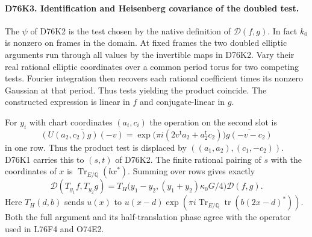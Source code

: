 \paragraph{D76K3. Identification and Heisenberg covariance of the doubled test.}
The $\psi$ of D76K2 is the test chosen by the native definition of
$\mathcal D(f,g)$. In fact $k_0$ is nonzero on frames in the domain.
At fixed frames the two doubled elliptic arguments run through
all values by the invertible maps in D76K2. Vary their real rational
elliptic coordinates over a common period torus for two competing
tests. Fourier integration then recovers each rational coefficient
times its nonzero Gaussian at that period. Thus tests yielding the
product coincide. The constructed expression is linear in $f$ and
conjugate-linear in $g$.

For $y_i$ with chart coordinates $(a_i,c_i)$ the operation on
the second slot is
\[
 \overline{(U(a_2,c_2)g)(-v)}
 =\exp\!\big(\pi i(2v^{\mathsf t}a_2+a_2^{\mathsf t}c_2)\big)
        \overline{g(-v-c_2)}
\]
in one row. Thus the product test is displaced by
$((a_1,a_2),(c_1,-c_2))$. D76K1 carries this to $(s,t)$ of
D76K2. The finite rational pairing of $s$ with the coordinates
of $x$ is $\operatorname{Tr}_{E/\mathbb Q}(bx^*)$. Summing over
rows gives exactly
\[
 \mathcal D(T_{y_1}f,T_{y_2}g)=
    T_H\big(y_1-y_2,(y_1+y_2)\kappa_0G/4\big)\mathcal D(f,g).
\]
Here $T_H(d,b)$ sends $u(x)$ to
$u(x-d)\exp(\pi i\operatorname{Tr}_{E/\mathbb Q}
 \operatorname{tr}(b(2x-d)^*))$. Both the full argument and its
half-translation phase agree with the operator used in L76F4
and O74E2.

